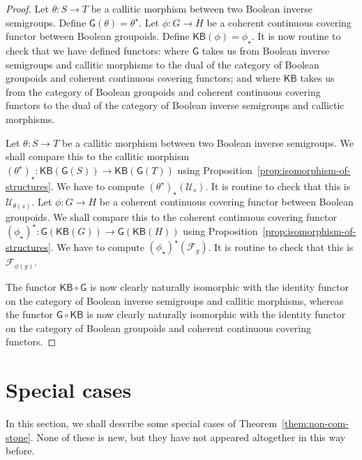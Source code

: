 \documentclass[a4paper]{amsart}
\begin{document}
\begin{proof}
Let $\theta \colon S \rightarrow T$ be a callitic morphism between two Boolean inverse semigroups.
Define $\mathsf{G}(\theta) = \theta^{\star}$.
Let $\phi \colon G \rightarrow H$ be a coherent continuous covering functor between Boolean groupoids.
Define $\mathsf{KB}(\mathsf{\phi}) = \phi_{\star}$.
It is now routine to check that we have defined functors:
where $\mathsf{G}$ takes us from Boolean inverse semigroups and callitic morphisms
to the dual of the category of Boolean groupoids and coherent continuous covering functors;
and where $\mathsf{KB}$ takes us from the category of Boolean groupoids and coherent continuous covering functors
to the dual of the category of Boolean inverse semigroups and callictic morphisms.


Let $\theta \colon S \rightarrow T$ be a callitic morphism between two Boolean inverse semigroups.
We shall compare this to the callitic morphism 
$(\theta^{\star})_{\star} \colon \mathsf{KB}(\mathsf{G}(S)) \rightarrow \mathsf{KB}(\mathsf{G}(T))$
using Proposition~\ref{prop:isomorphism-of-structures}.
We have to compute $(\theta^{\star})_{\star}(\mathscr{U}_{s})$.
It is routine to check that this is $\mathscr{U}_{\theta (s)}$. 
Let $\phi \colon G \rightarrow H$ be a coherent continuous covering functor between Boolean groupoids.
We shall compare this to the coherent continuous covering functor
$(\phi_{\star})^{\star} \colon \mathsf{G}(\mathsf{KB}(G)) \rightarrow \mathsf{G}(\mathsf{KB}(H))$
using Proposition~\ref{prop:isomorphism-of-structures}.
We have to compute $(\phi_{\star})^{\star}(\mathscr{F}_{g})$.
It is routine to check that this is $\mathscr{F}_{\phi (g)}$.

The functor $\mathsf{KB} \circ \mathsf{G}$ is now clearly naturally isomorphic with the identity functor on 
the category of Boolean inverse semigroups and callitic morphisms,
whereas
the functor $\mathsf{G} \circ \mathsf{KB}$ is now clearly naturally isomorphic with the identity functor on
the category of Boolean groupoids and coherent continuous covering functors.
\end{proof}


\section{Special cases}

In this section, we shall describe some special cases of Theorem~\ref{them:non-com-stone}. 
None of these is new, but they have not appeared altogether in this way before.
\end{document}
